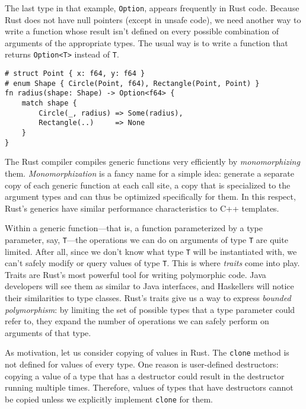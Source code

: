 \documentclass[]{article}
\begin{document}
The last type in that example, \texttt{Option}, appears frequently in
Rust code. Because Rust does not have null pointers (except in unsafe
code), we need another way to write a function whose result isn't
defined on every possible combination of arguments of the appropriate
types. The usual way is to write a function that returns
\texttt{Option\textless{}T\textgreater{}} instead of \texttt{T}.

\begin{verbatim}
# struct Point { x: f64, y: f64 }
# enum Shape { Circle(Point, f64), Rectangle(Point, Point) }
fn radius(shape: Shape) -> Option<f64> {
    match shape {
        Circle(_, radius) => Some(radius),
        Rectangle(..)     => None
    }
}
\end{verbatim}

The Rust compiler compiles generic functions very efficiently by
\emph{monomorphizing} them. \emph{Monomorphization} is a fancy name for
a simple idea: generate a separate copy of each generic function at each
call site, a copy that is specialized to the argument types and can thus
be optimized specifically for them. In this respect, Rust's generics
have similar performance characteristics to C++ templates.


Within a generic function---that is, a function parameterized by a type
parameter, say, \texttt{T}---the operations we can do on arguments of
type \texttt{T} are quite limited. After all, since we don't know what
type \texttt{T} will be instantiated with, we can't safely modify or
query values of type \texttt{T}. This is where \emph{traits} come into
play. Traits are Rust's most powerful tool for writing polymorphic code.
Java developers will see them as similar to Java interfaces, and
Haskellers will notice their similarities to type classes. Rust's traits
give us a way to express \emph{bounded polymorphism}: by limiting the
set of possible types that a type parameter could refer to, they expand
the number of operations we can safely perform on arguments of that
type.

As motivation, let us consider copying of values in Rust. The
\texttt{clone} method is not defined for values of every type. One
reason is user-defined destructors: copying a value of a type that has a
destructor could result in the destructor running multiple times.
Therefore, values of types that have destructors cannot be copied unless
we explicitly implement \texttt{clone} for them.
\end{document}
